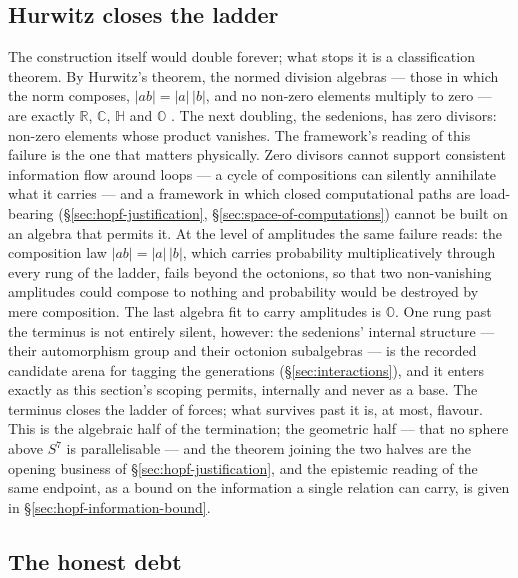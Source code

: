 \subsection{Hurwitz closes the ladder}

The construction itself would double forever; what stops it is a classification theorem. By
Hurwitz's theorem, the normed division algebras --- those in which the norm composes,
$\lvert ab\rvert = \lvert a\rvert\,\lvert b\rvert$, and no non-zero elements multiply to zero ---
are exactly $\mathbb{R}$, $\mathbb{C}$, $\mathbb{H}$ and $\mathbb{O}$
\autocite{hurwitz1898composition,baez2002octonions}. The next doubling, the sedenions, has zero
divisors: non-zero elements whose product vanishes. The framework's reading of this failure is the
one that matters physically. Zero divisors cannot support consistent information flow around loops
--- a cycle of compositions can silently annihilate what it carries --- and a framework in which
closed computational paths are load-bearing (\S\ref{sec:hopf-justification},
\S\ref{sec:space-of-computations}) cannot be built on an algebra that permits it. At the level of
amplitudes the same failure reads: the composition law
$\lvert ab\rvert = \lvert a\rvert\,\lvert b\rvert$, which carries probability multiplicatively
through every rung of the ladder, fails beyond the octonions, so that two non-vanishing amplitudes
could compose to nothing and probability would be destroyed by mere composition. The last algebra
fit to carry amplitudes is $\mathbb{O}$. One rung past the terminus is not entirely silent,
however: the sedenions' internal structure --- their automorphism group and their octonion
subalgebras --- is the recorded candidate arena for tagging the generations
(\S\ref{sec:interactions}), and it enters exactly as this section's scoping permits, internally
and never as a base. The terminus closes the ladder of forces; what survives past it is, at most,
flavour. This is the algebraic half of the termination; the
geometric half --- that no sphere above $S^{7}$ is parallelisable --- and the theorem joining the
two halves are the opening business of \S\ref{sec:hopf-justification}, and the epistemic reading of the same endpoint,
as a bound on the information a single relation can carry, is given in
\S\ref{sec:hopf-information-bound}.

\subsection{The honest debt}

